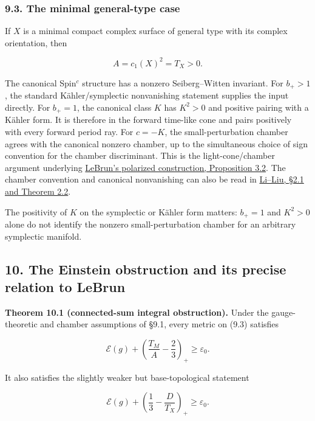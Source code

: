 \documentclass[
  11pt,
]{article}
\begin{document}
\hypertarget{the-minimal-general-type-case}{%
\subsubsection{9.3. The minimal general-type
case}\label{the-minimal-general-type-case}}

If \(X\) is a minimal compact complex surface of general type with its
complex orientation, then

\[
                          A=c_1(X)^2=T_X>0.
\]

The canonical Spin\(^c\) structure has a nonzero Seiberg--Witten
invariant. For \(b_+>1\), the standard Kähler/symplectic nonvanishing
statement supplies the input directly. For \(b_+=1\), the canonical
class \(K\) has \(K^2>0\) and positive pairing with a Kähler form. It is
therefore in the forward time-like cone and pairs positively with every
forward period ray. For \(c=-K\), the small-perturbation chamber agrees
with the canonical nonzero chamber, up to the simultaneous choice of
sign convention for the chamber discriminant. This is the
light-cone/chamber argument underlying
\href{https://arxiv.org/pdf/math/0003068}{LeBrun's polarized
construction, Proposition 3.2}. The chamber convention and canonical
nonvanishing can also be read in
\href{https://arxiv.org/pdf/math/0012048}{Li--Liu, §2.1 and Theorem
2.2}.

The positivity of \(K\) on the symplectic or Kähler form matters:
\(b_+=1\) and \(K^2>0\) alone do not identify the nonzero
small-perturbation chamber for an arbitrary symplectic manifold.

\hypertarget{the-einstein-obstruction-and-its-precise-relation-to-lebrun}{%
\subsection{10. The Einstein obstruction and its precise relation to
LeBrun}\label{the-einstein-obstruction-and-its-precise-relation-to-lebrun}}

\textbf{Theorem 10.1 (connected-sum integral obstruction).} Under the
gauge-theoretic and chamber assumptions of §9.1, every metric on (9.3)
satisfies

\[
 \mathcal E(g)+\left(\frac{T_M}{A}-\frac23\right)_+
                         \ge\varepsilon_0.               \tag{10.1}
\]

It also satisfies the slightly weaker but base-topological statement

\[
 \boxed{\displaystyle
 \mathcal E(g)+\left(\frac13-\frac{D}{T_X}\right)_+
                         \ge\varepsilon_0.}              \tag{10.2}
\]
\end{document}
